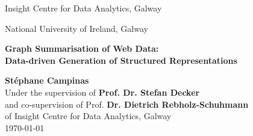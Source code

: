 \documentclass[12pt,chapterprefix=true]{scrbook}
\begin{document}
\begin{titlepage}
	\begin{center}
		\null
		\vspace{2cm}
		{\Large
		Insight Centre for Data Analytics, Galway\\
		\begin{figure}[h]
			\centering
		\end{figure}
		National University of Ireland, Galway\\
		\begin{figure}[h]
			\centering
		\end{figure}
		}
		\vspace{2cm}
		\begin{doublespacing}
		{\Huge \textbf{Graph Summarisation of Web Data:}}\\
		{\Huge \textbf{Data-driven Generation of Structured Representations}}\\
		\end{doublespacing}
		\vspace{1cm}
		{\Large \textbf{St\'ephane Campinas}}\\
		\vspace{1cm}
		Under the supervision of \textbf{Prof. Dr. Stefan Decker}\\
		and co-supervision of Prof. \textbf{Dr. Dietrich Rebholz-Schuhmann}\\
		of Insight Centre for Data Analytics, Galway\\
		\vspace{2cm}
		\today
	\end{center}
\end{titlepage}
\end{document}
